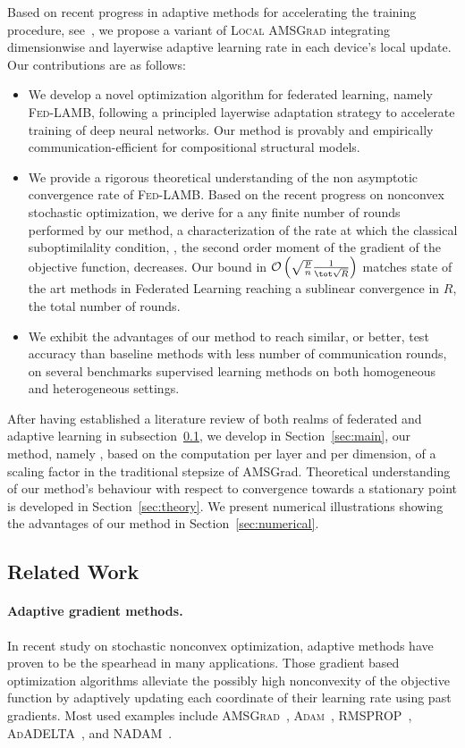 \documentclass{article}
\begin{document}
Based on recent progress in adaptive methods for accelerating the training procedure, see~\citet{you2019large}, we propose a variant of \textsc{Local AMSGrad} integrating dimensionwise and layerwise adaptive learning rate in each device's local update.
Our contributions are as follows:
\begin{itemize}
\item We develop a novel optimization algorithm for federated learning, namely \textsc{Fed-LAMB}, following a principled layerwise adaptation strategy to accelerate training of deep neural networks. Our method is provably and empirically communication-efficient for compositional structural models.
\item We provide a rigorous theoretical understanding of the non asymptotic convergence rate of \textsc{Fed-LAMB}. Based on the recent progress on nonconvex stochastic optimization, we derive for a any finite number of rounds performed by our method, a characterization of the rate at which the classical suboptimilality condition, \ie, the second order moment of the gradient of the objective function, decreases. Our bound  in $\mathcal{O}\left(\sqrt{\frac{ p}{ n}} \frac{1}{\tot \sqrt{R} } \right)$ matches state of the art methods in Federated Learning reaching a sublinear convergence in $R$, the total number of rounds.
\item We exhibit the advantages of our method to reach similar, or better, test accuracy than baseline methods with less number of communication rounds, on several benchmarks supervised learning methods on both homogeneous and heterogeneous settings.
\end{itemize}

After having established a literature review of both realms of federated and adaptive learning in subsection~\ref{sec:related}, we develop in Section~\ref{sec:main}, our method, namely \algo, based on the computation per layer and per dimension, of a scaling factor in the traditional stepsize of AMSGrad.
Theoretical understanding of our method's behaviour with respect to convergence towards a stationary point is developed in Section~\ref{sec:theory}.
We present numerical illustrations showing the advantages of our method in Section~\ref{sec:numerical}.

\subsection{Related Work}\label{sec:related}

\paragraph{Adaptive gradient methods.}
In recent study on stochastic nonconvex optimization, adaptive methods have proven to be the spearhead in many applications.
Those gradient based optimization algorithms alleviate the possibly high nonconvexity of the objective function by adaptively updating each coordinate of their learning rate using past gradients. Most used examples include \textsc{AMSGrad}~\citep{RKK18}, \textsc{Adam}~\citep{KB15}, \textsc{RMSPROP}~\citep{TH12}, \textsc{AdADELTA}~\citep{Z12}, and \textsc{NADAM}~\citep{D16}.
\end{document}
